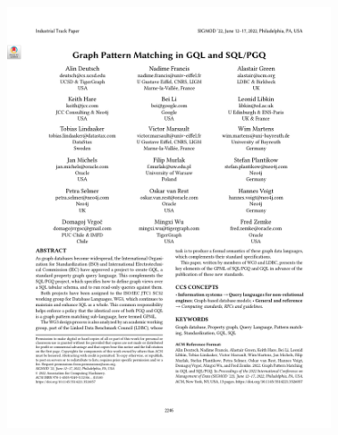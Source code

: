 \documentclass[
	aspectratio=169,
	compress,
]{beamer}
\begin{document}
\begin{frame}
\begin{columns}[T]
        \pause
		\begin{column}{0.3\textwidth}
            \begin{figure}
                \caption{\cite{DBLP:GraphPatternMatchinginGQL}}
                \begin{center}
                    \includegraphics[width=\textwidth]{./figures/graphPatternMatchingGQL.png}
                \end{center}
            \end{figure}
        \end{column}
        \pause
		\begin{column}{0.3\textwidth}
            \begin{figure}
                \caption{\cite{SPARQLDocs}}
                \begin{center}

\end{center}
\end{figure}
\end{column}
\end{columns}
\end{frame}
\end{document}
